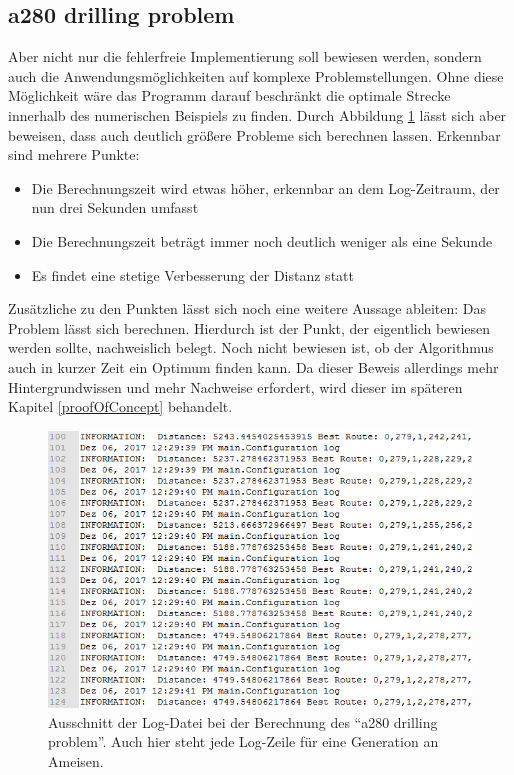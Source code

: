 \subsection{a280 drilling problem}
Aber nicht nur die fehlerfreie Implementierung soll bewiesen werden, sondern auch die Anwendungsmöglichkeiten auf komplexe Problemstellungen. Ohne diese Möglichkeit wäre das Programm darauf beschränkt die optimale Strecke innerhalb des numerischen Beispiels zu finden. Durch Abbildung \ref{drillingBeweis} lässt sich aber beweisen, dass auch deutlich größere Probleme sich berechnen lassen. Erkennbar sind mehrere Punkte:
\begin{itemize}
	\item Die Berechnungszeit wird etwas höher, erkennbar an dem Log-Zeitraum, der nun drei Sekunden umfasst
	\item Die Berechnungszeit beträgt immer noch deutlich weniger als eine Sekunde
	\item Es findet eine stetige Verbesserung der Distanz statt
\end{itemize}
Zusätzliche zu den Punkten lässt sich noch eine weitere Aussage ableiten: Das Problem lässt sich berechnen. Hierdurch ist der Punkt, der eigentlich bewiesen werden sollte, nachweislich belegt. Noch nicht bewiesen ist, ob der Algorithmus auch in kurzer Zeit ein Optimum finden kann. Da dieser Beweis allerdings mehr Hintergrundwissen und mehr Nachweise erfordert, wird dieser im späteren Kapitel \ref{proofOfConcept} behandelt.

\begin{figure}[H]
	\centering
	\includegraphics[width=0.6\linewidth]{images/a280Ergebnis.png}
	\caption{Ausschnitt der Log-Datei bei der Berechnung des ``a280 drilling problem''. Auch hier steht jede Log-Zeile für eine Generation an Ameisen.}
	\label{drillingBeweis}
\end{figure}